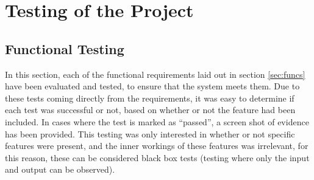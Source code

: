 \section{Testing of the Project}

\subsection{Functional Testing}
In this section, each of the functional requirements laid out in section \ref{sec:funcs} have been evaluated and tested, to ensure that the system meets them. Due to these tests coming directly from the requirements, it was easy to determine if each test was successful or not, based on whether or not the feature had been included. In cases where the test is marked as ``passed'', a screen shot of evidence has been provided. This testing was only interested in whether or not specific features were present, and the inner workings of these features was irrelevant, for this reason, these can be considered black box tests\cite{beizer1995black} (testing where only the input and output can be observed).\ \\
\ \\
\noindent 
